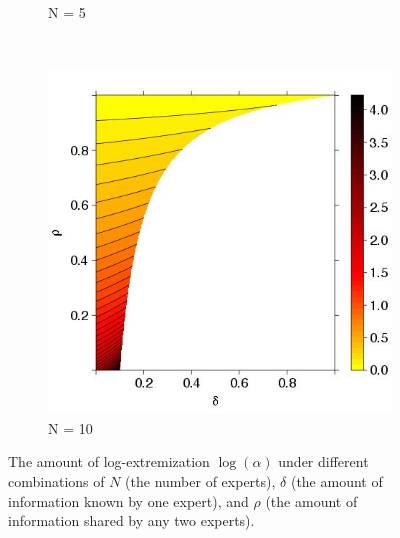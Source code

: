 \documentclass[11pt,twoside]{article}
\begin{document}
\begin{figure}
\begin{subfigure}[b]{0.32\textwidth}
\caption{N = 5}
\label{ExtremeN10}
        \end{subfigure}
        ~ %
        \begin{subfigure}[b]{0.32\textwidth}
                \includegraphics[width=\textwidth]{ExtremeN10.jpeg}
\caption{N = 10}
\label{ExtremeN30}
        \end{subfigure}
        \caption{ The amount of log-extremization $\log(\alpha)$ under different combinations of $N$ (the number of experts), $\delta$ (the amount of information known by one expert), and $\rho$ (the amount of information shared by any two experts).}
\end{figure}
\end{document}
